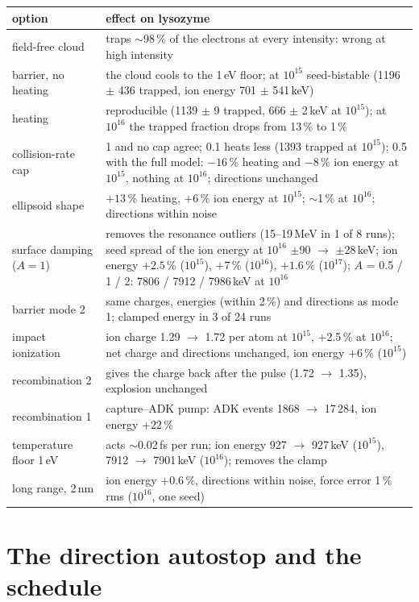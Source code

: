 \begin{longtable}{@{}p{}p{}@{}}
\toprule
option & effect on lysozyme \\
\midrule
\endhead
field-free cloud & traps $\sim$98\,\% of the electrons at every intensity: wrong at high intensity \\
barrier, no heating & the cloud cools to the 1\,eV floor; at $10^{15}$ seed-bistable (1196 $\pm$ 436 trapped, ion energy
  701 $\pm$ 541\,keV) \\
heating & reproducible (1139 $\pm$ 9 trapped, 666 $\pm$ 2\,keV at $10^{15}$); at $10^{16}$ the trapped fraction drops from
  13\,\% to 1\,\% \\
collision-rate cap & 1 and no cap agree; 0.1 heats less (1393 trapped at $10^{15}$); 0.5 with the full model: $-16$\,\%
  heating and $-8$\,\% ion energy at $10^{15}$, nothing at $10^{16}$; directions unchanged \\
ellipsoid shape & $+13$\,\% heating, $+6$\,\% ion energy at $10^{15}$; $\sim$1\,\% at $10^{16}$; directions within noise \\
surface damping ($A=1$) & removes the resonance outliers (15--19\,MeV in 1 of 8 runs); seed spread of the ion energy at
  $10^{16}$ $\pm$90 $\to$ $\pm$28\,keV; ion energy $+2.5$\,\% ($10^{15}$), $+7$\,\% ($10^{16}$), $+1.6$\,\% ($10^{17}$);
  $A$ = 0.5 / 1 / 2: 7806 / 7912 / 7986\,keV at $10^{16}$ \\
barrier mode 2 & same charges, energies (within 2\,\%) and directions as mode 1; clamped energy in 3 of 24 runs \\
impact ionization & ion charge 1.29 $\to$ 1.72 per atom at $10^{15}$, +2.5\,\% at $10^{16}$; net charge and directions
  unchanged, ion energy $+6$\,\% ($10^{15}$) \\
recombination 2 & gives the charge back after the pulse (1.72 $\to$ 1.35), explosion unchanged \\
recombination 1 & capture--ADK pump: ADK events 1868 $\to$ 17\,284, ion energy $+22$\,\% \\
temperature floor 1\,eV & acts $\sim$0.02\,fs per run; ion energy 927 $\to$ 927\,keV ($10^{15}$), 7912 $\to$ 7901\,keV
  ($10^{16}$); removes the clamp \\
long range, 2\,nm & ion energy $+0.6$\,\%, directions within noise, force error 1\,\% rms ($10^{16}$, one seed) \\
\bottomrule
\end{longtable}

\section{The direction autostop and the schedule}
\label{sec:val-schedule}

